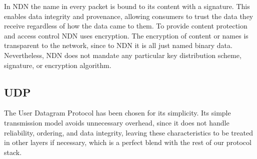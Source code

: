In NDN the name in every packet is bound to its content with a signature.
This enables data integrity and provenance, allowing consumers to trust the data they receive regardless of how the data came to them.
To provide content protection and access control NDN uses encryption.
The encryption of content or names is transparent to the network, since to NDN it is all just named binary data.
Nevertheless, NDN does not mandate any particular key distribution scheme, signature, or encryption algorithm.

\subsection{UDP}
The User Datagram Protocol has been chosen for its simplicity. Its simple transmission 
model avoids unnecessary overhead, since it does not handle reliability, ordering, 
and data integrity, leaving these characteristics to be treated in other layers if necessary, which is a 
perfect blend with the rest of our protocol stack.
